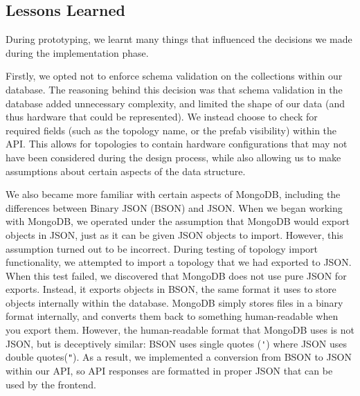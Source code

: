 \documentclass[11pt]{article}
\begin{document}
	\subsection{Lessons Learned}
		During prototyping, we learnt many things that influenced the decisions we made during the implementation phase.

		Firstly, we opted not to enforce schema validation on the collections within our database.
		The reasoning behind this decision was that schema validation in the database added unnecessary complexity, and limited the shape of our data (and thus hardware that could be represented).
		We instead choose to check for required fields (such as the topology name, or the prefab visibility) within the API.
		This allows for topologies to contain hardware configurations that may not have been considered during the design process, while also allowing us to make assumptions about certain aspects of the data structure.

		We also became more familiar with certain aspects of MongoDB, including the differences between Binary JSON (BSON) and JSON.
		When we began working with MongoDB, we operated under the assumption that MongoDB would export objects in JSON, just as it can be given JSON objects to import.
		However, this assumption turned out to be incorrect. 
		During testing of topology import functionality, we attempted to import a topology that we had exported to JSON.
		When this test failed, we discovered that MongoDB does not use pure JSON for exports.
		Instead, it exports objects in BSON, the same format it uses to store objects internally within the database.
		MongoDB simply stores files in a binary format internally, and converts them back to something human-readable when you export them. 
		However, the human-readable format that MongoDB uses is not JSON, but is deceptively similar: BSON uses single quotes (\verb|'|) where JSON uses double quotes(\verb|"|).
		As a result, we implemented a conversion from BSON to JSON within our API, so API responses are formatted in proper JSON that can be used by the frontend.
		


\newpage
\end{document}
